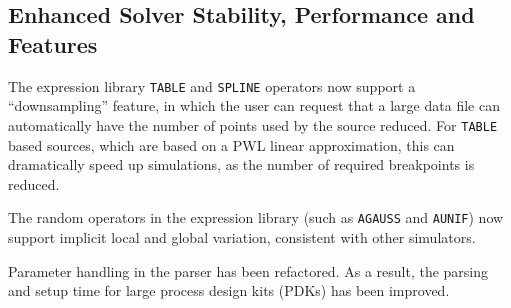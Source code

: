 \documentclass[letterpaper]{scrartcl}
\begin{document}
\subsection*{Enhanced Solver Stability, Performance and Features}
\begin{XyceItemize}

\item The expression library \texttt{TABLE} and \texttt{SPLINE} operators now
     support a ``downsampling'' feature, in which the user can request that a
     large data file can automatically have the number of points used by the
     source reduced.  For \texttt{TABLE} based sources, which are based on a
     PWL linear approximation, this can dramatically speed up simulations, as
     the number of required breakpoints is reduced.

\item The random operators in the expression library (such as \texttt{AGAUSS}
     and \texttt{AUNIF}) now support implicit local and global variation,
     consistent with other simulators.

\item Parameter handling in the parser has been refactored. As a result, the
     parsing and setup time for large process design kits (PDKs) has been
     improved.

\end{XyceItemize}
\end{document}
